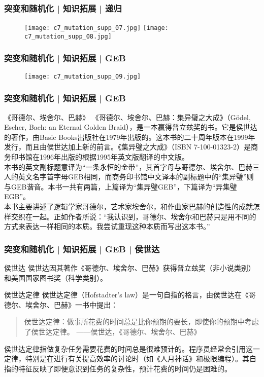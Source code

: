 \begin{frame}
  \frametitle{突变和随机化 | 知识拓展 | 递归}
  \begin{figure}
    \centering
    \texttt{[image: c7\_mutation\_supp\_07.jpg]}\quad
    \texttt{[image: c7\_mutation\_supp\_08.jpg]}
  \end{figure}
\end{frame}

\begin{frame}
  \frametitle{突变和随机化 | 知识拓展 | GEB}
  \begin{figure}
    \centering
    \texttt{[image: c7\_mutation\_supp\_09.jpg]}
  \end{figure}
\end{frame}

\begin{frame}
  \frametitle{突变和随机化 | 知识拓展 | GEB}
  \begin{block}{《哥德尔、埃舍尔、巴赫》}
    《哥德尔、埃舍尔、巴赫：集异璧之大成》（Gödel, Escher, Bach: an Eternal Golden Braid），是一本赢得普立兹奖的书。它是侯世达的著作，由Basic Books出版社在1979年出版的。这本书的二十周年版本在1999年发行，而且由侯世达加上新的前言。《集异璧之大成》（ISBN 7-100-01323-2）是商务印书馆在1996年出版的根据1995年英文版翻译的中文版。\\
    \vspace{0.3em}
本书的英文副标题意译为“一条永恒的金带”，其首字母与哥德尔、埃舍尔、巴赫三人的英文名字首字母GEB相同，而商务印书馆中文译本的副标题中的“集异璧”则与GEB谐音。本书一共有两篇，上篇译为“集异璧GEB”，下篇译为“异集璧EGB”。 \\
    \vspace{0.3em}
本书主要讲述了逻辑学家哥德尔，艺术家埃舍尔，和作曲家巴赫的创造性的成就怎样交织在一起。正如作者所说：“我认识到，哥德尔、埃舍尔和巴赫只是用不同的方式来表达一样相同的本质。我尝试重现这种本质而写出这本书。”
  \end{block}
\end{frame}

\begin{frame}
  \frametitle{突变和随机化 | 知识拓展 | GEB | 侯世达}
  \begin{block}{侯世达}
    侯世达因其著作《哥德尔、埃舍尔、巴赫》获得普立兹奖（非小说类别）和美国国家图书奖（科学类别）。
  \end{block}
  \begin{block}{\alert{侯世达定律}}
    侯世达定律（Hofstadter's law）是一句自指的格言，由侯世达在《哥德尔、埃舍尔、巴赫》一书中提出：
    \begin{quote}
    侯世达定律：做事所花费的时间总是比你预期的要长，即使你的预期中考虑了侯世达定律。 ——侯世达，《哥德尔、埃舍尔、巴赫》
    \end{quote}
侯世达定律指做复杂任务需要花费的时间总是很难预计的。程序员经常会引用这一定律，特别是在进行有关提高效率的讨论时（如《人月神话》和极限编程）。其自指的特征反映了即便意识到任务的复杂性，预计花费的时间仍是困难的。
  \end{block}
\end{frame}

